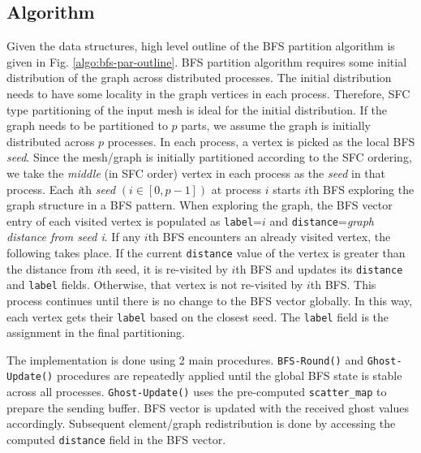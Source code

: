 \documentclass[conference]{IEEEtran}
\begin{document}
\subsection{Algorithm}
Given the data structures, high level outline of the BFS partition algorithm is given in Fig. \ref{algo:bfs-par-outline}. BFS partition algorithm requires some initial distribution of the graph across distributed processes. The initial distribution needs to have some locality in the graph vertices in each process. Therefore, SFC type partitioning of the input mesh is ideal for the initial distribution. If the graph needs to be partitioned to $p$ parts, we assume the graph is initially distributed across $p$ processes. In each process, a vertex is picked as the local BFS \emph{seed}. Since the mesh/graph is initially partitioned according to the SFC ordering, we take the \emph{middle} (in SFC order) vertex in each process as the \emph{seed} in that process. Each \emph{i}th \emph{seed} $(i \in [0, p-1])$ at process $i$ starts $i$th BFS exploring the graph structure in a BFS pattern. When exploring the graph, the BFS vector entry of each visited vertex is populated as \verb|label|=$i$ and \verb|distance|=\emph{graph distance from seed i}. If any $i$th BFS encounters an already visited vertex, the following takes place. If the current \verb|distance| value of the vertex is greater than the distance from $i$th seed, it is re-visited by $i$th BFS and updates its \verb|distance| and \verb|label| fields. Otherwise, that vertex is not re-visited by $i$th BFS. This process continues until there is no change to the BFS vector globally. In this way, each vertex gets their \verb|label| based on the closest seed. The \verb|label| field is the assignment in the final partitioning.
\par
The implementation is done using 2 main procedures. \verb|BFS-Round()| and \verb|Ghost-Update()| procedures are repeatedly applied until the global BFS state is stable across all processes. \verb|Ghost-Update()| uses the pre-computed \verb|scatter_map| to prepare the sending buffer. BFS vector is updated with the received ghost values accordingly. Subsequent element/graph redistribution is done by accessing the computed \verb|distance| field in the BFS vector.
\end{document}

